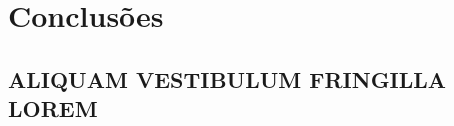 \chapter{Conclusões}

\lipsum[1]

\section{\uppercase{Aliquam vestibulum fringilla lorem}}

\lipsum[1]

\lipsum[2-3]